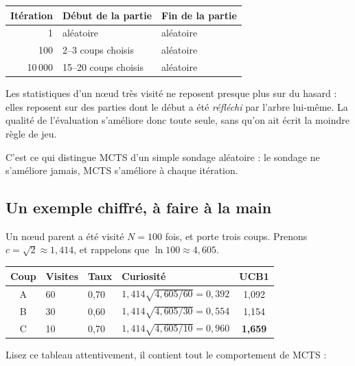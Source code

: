 \begin{center}
\begin{tabular}{@{}rll@{}}
\toprule
\textbf{Itération} & \textbf{Début de la partie} & \textbf{Fin de la partie} \\
\midrule
1        & aléatoire            & aléatoire \\
100      & 2--3 coups choisis   & aléatoire \\
10\,000  & 15--20 coups choisis & aléatoire \\
\bottomrule
\end{tabular}
\end{center}

\begin{nkretenir}
Les statistiques d'un nœud très visité ne reposent presque plus sur du hasard :
elles reposent sur des parties dont le début a été \emph{réfléchi} par l'arbre
lui-même. La qualité de l'évaluation s'améliore donc toute seule, sans qu'on
ait écrit la moindre règle de jeu.

C'est ce qui distingue MCTS d'un simple sondage aléatoire : le sondage ne
s'améliore jamais, MCTS s'améliore à chaque itération.
\end{nkretenir}

\subsection{Un exemple chiffré, à faire à la main}

Un nœud parent a été visité $N = 100$ fois, et porte trois coups. Prenons
$c = \sqrt{2} \approx 1{,}414$, et rappelons que $\ln 100 \approx 4{,}605$.

\begin{center}
\begin{tabular}{@{}clllc@{}}
\toprule
\textbf{Coup} & \textbf{Visites} & \textbf{Taux} & \textbf{Curiosité} & \textbf{UCB1} \\
\midrule
A & 60 & 0,70 & $1{,}414\sqrt{4{,}605/60} = 0{,}392$  & 1,092 \\
B & 30 & 0,60 & $1{,}414\sqrt{4{,}605/30} = 0{,}554$  & 1,154 \\
C & 10 & 0,70 & $1{,}414\sqrt{4{,}605/10} = 0{,}960$  & \textbf{1,659} \\
\bottomrule
\end{tabular}
\end{center}

Lisez ce tableau attentivement, il contient tout le comportement de MCTS :

